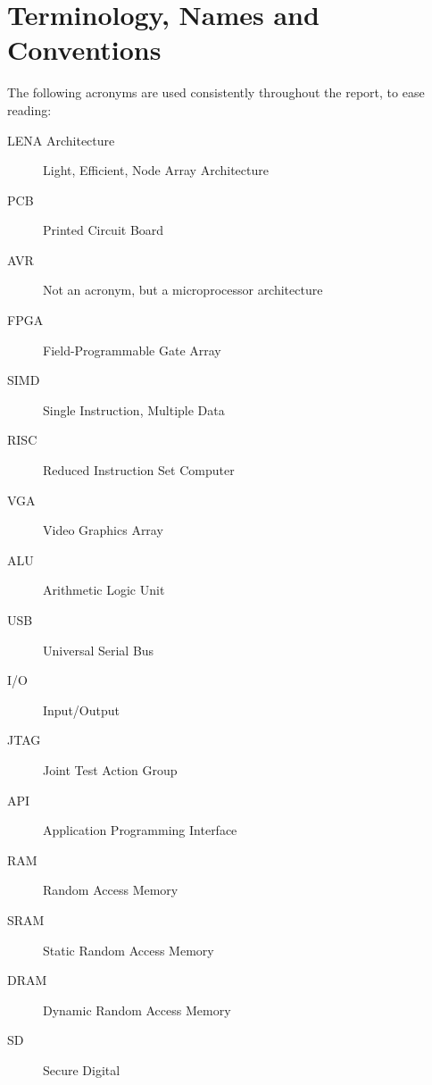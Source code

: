 \section{Terminology, Names and Conventions}
The following acronyms are used consistently throughout the report, to ease
reading: 

\begin{description}
\item[LENA Architecture] Light, Efficient, Node Array Architecture
\end{description}

\begin{description}
\item[PCB] Printed Circuit Board
\item[AVR] Not an acronym, but a microprocessor architecture
\item[FPGA] Field-Programmable Gate Array
\item[SIMD] Single Instruction, Multiple Data 
\item[RISC] Reduced Instruction Set Computer
\item[VGA] Video Graphics Array
\item[ALU] Arithmetic Logic Unit
\item[USB] Universal Serial Bus
\item[I/O] Input/Output
\item[JTAG] Joint Test Action Group
\item[API] Application Programming Interface
\item[RAM] Random Access Memory
\item[SRAM] Static Random Access Memory
\item[DRAM] Dynamic Random Access Memory
\item[SD] Secure Digital
\end{description}
